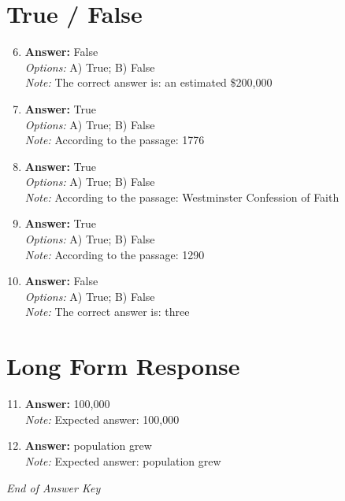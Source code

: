 \documentclass[12pt]{article}
\begin{document}
\section*{True / False}
\begin{enumerate}[label=\arabic*.]
\setcounter{enumi}{5}
\item \textbf{Answer:} False
\\ \textit{Options:} A) True; B) False
\\ \textit{Note:} The correct answer is: an estimated \$200,000
\item \textbf{Answer:} True
\\ \textit{Options:} A) True; B) False
\\ \textit{Note:} According to the passage: 1776
\item \textbf{Answer:} True
\\ \textit{Options:} A) True; B) False
\\ \textit{Note:} According to the passage: Westminster Confession of Faith
\item \textbf{Answer:} True
\\ \textit{Options:} A) True; B) False
\\ \textit{Note:} According to the passage: 1290
\item \textbf{Answer:} False
\\ \textit{Options:} A) True; B) False
\\ \textit{Note:} The correct answer is: three
\end{enumerate}

\section*{Long Form Response}
\begin{enumerate}[label=\arabic*.]
\setcounter{enumi}{10}
\item \textbf{Answer:} 100,000
\\ \textit{Note:} Expected answer: 100,000
\item \textbf{Answer:} population grew
\\ \textit{Note:} Expected answer: population grew
\end{enumerate}

\vfill
\noindent\textit{End of Answer Key}
\end{document}
